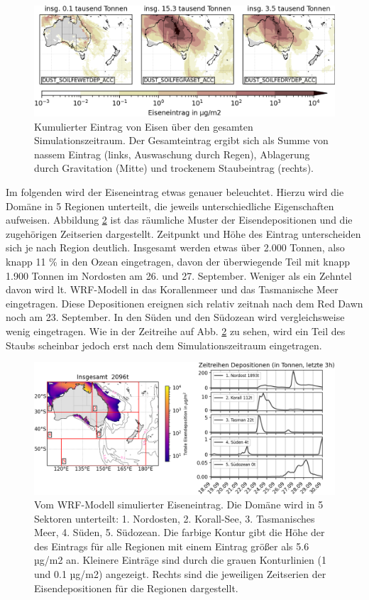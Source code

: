 \documentclass[12pt,a4paper,onecolumn]{scrartcl}
\begin{document}
\begin{figure}
\includegraphics[width=\textwidth]{bilder/iron_deposition_vars.png}
\caption{Kumulierter Eintrag von Eisen über den gesamten Simulationszeitraum. Der Gesamteintrag ergibt sich als Summe von nassem Eintrag (links, Auswaschung durch Regen), Ablagerung durch Gravitation (Mitte) und trockenem Staubeintrag (rechts).} \label{fig:iron_deposition}
\end{figure}
Im folgenden wird der Eiseneintrag etwas genauer beleuchtet. Hierzu wird die Domäne in 5 Regionen unterteilt, die jeweils unterschiedliche Eigenschaften aufweisen. Abbildung \ref{fig:iron_deposition_sections} ist das räumliche Muster der Eisendepositionen und die zugehörigen Zeitserien dargestellt. Zeitpunkt und Höhe des Eintrag unterscheiden sich je nach Region deutlich. Insgesamt werden etwas über 2.000 Tonnen, also knapp 11 \% in den Ozean eingetragen, davon der überwiegende Teil mit knapp 1.900 Tonnen im Nordosten am 26. und 27. September. Weniger als ein Zehntel davon wird lt. WRF-Modell in das Korallenmeer und das Tasmanische Meer eingetragen. Diese Depositionen ereignen sich relativ zeitnah nach dem Red Dawn noch am 23. September. In den Süden und den Südozean wird vergleichsweise wenig eingetragen. Wie in der Zeitreihe auf Abb. \ref{fig:iron_deposition_sections} zu sehen, wird ein Teil des Staubs scheinbar jedoch erst nach dem Simulationszeitraum eingetragen.
\begin{figure}
\includegraphics[width=\textwidth]{bilder/total_iron.png}
\caption{Vom WRF-Modell simulierter Eiseneintrag. Die Domäne wird in 5 Sektoren unterteilt: 1. Nordosten, 2. Korall-See, 3. Tasmanisches Meer, 4. Süden, 5. Südozean. Die farbige Kontur gibt die Höhe der des Eintrags für alle Regionen mit einem Eintrag größer als 5.6 µg/m2 an. Kleinere Einträge sind durch die grauen Konturlinien (1 und 0.1 µg/m2) angezeigt. Rechts sind die jeweiligen Zeitserien der Eisendepositionen für die Regionen dargestellt.} \label{fig:iron_deposition_sections}
\end{figure}
\end{document}
